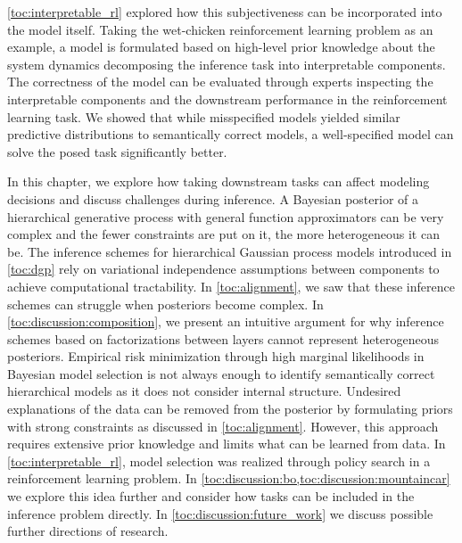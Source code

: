 \cref{toc:interpretable_rl} explored how this subjectiveness can be incorporated into the model itself.
Taking the wet-chicken reinforcement learning problem as an example, a model is formulated based on high-level prior knowledge about the system dynamics decomposing the inference task into interpretable components.
The correctness of the model can be evaluated through experts inspecting the interpretable components and the downstream performance in the reinforcement learning task.
We showed that while misspecified models yielded similar predictive distributions to semantically correct models, a well-specified model can solve the posed task significantly better.

In this chapter, we explore how taking downstream tasks can affect modeling decisions and discuss challenges during inference.
A Bayesian posterior of a hierarchical generative process with general function approximators can be very complex and the fewer constraints are put on it, the more heterogeneous it can be.
The inference schemes for hierarchical Gaussian process models introduced in \cref{toc:dgp} rely on variational independence assumptions between components to achieve computational tractability.
In \cref{toc:alignment}, we saw that these inference schemes can struggle when posteriors become complex.
In \cref{toc:discussion:composition}, we present an intuitive argument for why inference schemes based on factorizations between layers cannot represent heterogeneous posteriors.
Empirical risk minimization through high marginal likelihoods in Bayesian model selection is not always enough to identify semantically correct hierarchical models as it does not consider internal structure.
Undesired explanations of the data can be removed from the posterior by formulating priors with strong constraints as discussed in \cref{toc:alignment}.
However, this approach requires extensive prior knowledge and limits what can be learned from data.
In \cref{toc:interpretable_rl}, model selection was realized through policy search in a reinforcement learning problem.
In \cref{toc:discussion:bo,toc:discussion:mountaincar} we explore this idea further and consider how tasks can be included in the inference problem directly.
In \cref{toc:discussion:future_work} we discuss possible further directions of research.


